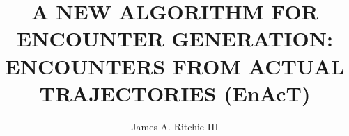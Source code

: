 \documentclass[12pt]{rowanthesis}
\title{A NEW ALGORITHM FOR ENCOUNTER GENERATION: ENCOUNTERS FROM ACTUAL TRAJECTORIES (EnAcT)}
\author{James A. Ritchie III}
\begin{document}
\makeTitlePage

 

\begin{frontmatter}
    
    
    \buildAbstract
    
    \buildTOC
    \buildListOfFigures
    \buildListOfTables
\end{frontmatter}

\begin{thesisbody}
    
    
    
    
    
    
    
    
    
    \buildBibliography
    
    
    
\end{thesisbody}
\end{document}
